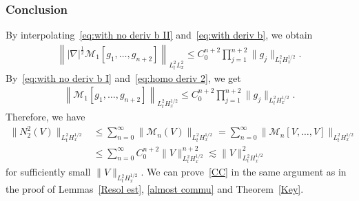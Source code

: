 \documentclass[10pt,a4paper]{amsart}
\newcommand{\CM}{\mathcal{M}}
\newcommand{\I}{\infty}
\newcommand{\tw}{\frac{1}{2}}
\newcommand{\na}{\nabla}
\newcommand{\ls}{\lesssim}
\begin{document}
\subsubsection{Conclusion} 

By interpolating~\eqref{eq:with no deriv b II} and~\eqref{eq:with deriv b}, we obtain
\begin{align}\label{eq:homo deriv 2}
\left\||\na|^\tw \CM_1[g_1,\dots,g_{n+2}]\right\|_{L^2_t L^2_x} \le C_0^{n+2} \prod_{j=1}^{n+2} \|g_j\|_{L^2_t H^{1/2}_x}.
\end{align}
By~\eqref{eq:with no deriv b I} and~\eqref{eq:homo deriv 2}, we get
\begin{align}
\left\|\CM_1 [g_1,\dots,g_{n+2}]\right\|_{L^2_t H^{1/2}_x} \le C_0^{n+2} \prod_{j=1}^{n+2} \|g_j\|_{L^2_t H^{1/2}_x}.
\end{align}
Therefore, we have
\begin{equation}
\begin{split}
\|N_2^2(V)\|_{L^2_t H^{1/2}_x} &\le \sum_{n=0}^\I \|\CM_n(V)\|_{L^2_t H^{1/2}_x} = \sum_{n=0}^\I \|\CM_n[V,\dots,V]\|_{L^2_t H^{1/2}_x} \\
&\le \sum_{n=0}^\I C_0^{n+2} \|V\|_{L^2_t H^{1/2}_x}^{n+2}
\ls \|V\|_{L^2_t H^{1/2}_x}^2
\end{split}
\end{equation}
for sufficiently small $\|V\|_{L^2_t H^{1/2}_x}$. We can prove~\eqref{CC} in the same argument as in the proof of Lemmas~\ref{Resol est}, \ref{almost commu} and Theorem~\ref{Key}.
\end{document}
